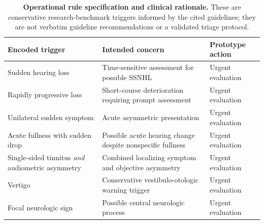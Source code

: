 \begin{table}[htbp]
\centering
\caption{\textbf{Operational rule specification and clinical rationale.} These
are conservative research-benchmark triggers informed by the cited guidelines;
they are not verbatim guideline recommendations or a validated triage protocol.}
\label{tab:rule_traceability}
\small
\begin{tabular}{p{}p{}p{}}
\toprule
Encoded trigger & Intended concern & Prototype action \\
\midrule
Sudden hearing loss & Time-sensitive assessment for possible SSNHL & Urgent evaluation \\
Rapidly progressive loss & Short-course deterioration requiring prompt assessment & Urgent evaluation \\
Unilateral sudden symptom & Acute asymmetric presentation & Urgent evaluation \\
Acute fullness with sudden drop & Possible acute hearing change despite nonspecific fullness & Urgent evaluation \\
Single-sided tinnitus \emph{and} audiometric asymmetry & Combined localizing symptom and objective asymmetry & Urgent evaluation \\
Vertigo & Conservative vestibulo-otologic warning trigger & Urgent evaluation \\
Focal neurologic sign & Possible central neurologic process & Urgent evaluation \\
\bottomrule
\end{tabular}
\end{table}
